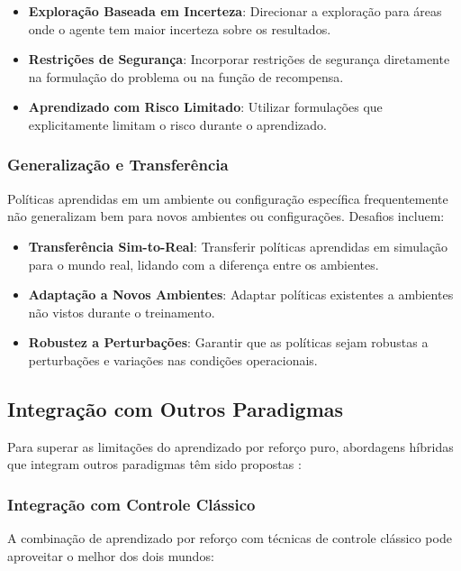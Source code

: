 \begin{itemize}
    \item \textbf{Exploração Baseada em Incerteza}: Direcionar a exploração para áreas onde o agente tem maior incerteza sobre os resultados.
    \item \textbf{Restrições de Segurança}: Incorporar restrições de segurança diretamente na formulação do problema ou na função de recompensa.
    \item \textbf{Aprendizado com Risco Limitado}: Utilizar formulações que explicitamente limitam o risco durante o aprendizado.
\end{itemize}

\subsubsection{Generalização e Transferência}

Políticas aprendidas em um ambiente ou configuração específica frequentemente não generalizam bem para novos ambientes ou configurações. Desafios incluem:

\begin{itemize}
    \item \textbf{Transferência Sim-to-Real}: Transferir políticas aprendidas em simulação para o mundo real, lidando com a diferença entre os ambientes.
    \item \textbf{Adaptação a Novos Ambientes}: Adaptar políticas existentes a ambientes não vistos durante o treinamento.
    \item \textbf{Robustez a Perturbações}: Garantir que as políticas sejam robustas a perturbações e variações nas condições operacionais.
\end{itemize}

\subsection{Integração com Outros Paradigmas}

Para superar as limitações do aprendizado por reforço puro, abordagens híbridas que integram outros paradigmas têm sido propostas \cite{Kober2013}:

\subsubsection{Integração com Controle Clássico}

A combinação de aprendizado por reforço com técnicas de controle clássico pode aproveitar o melhor dos dois mundos:

